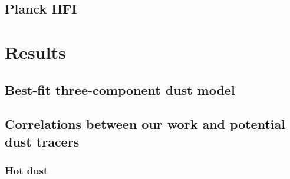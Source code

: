 \documentclass{aa}
\begin{document}
\subsection{Planck HFI}
\clearpage
\section{Results}

\subsection{Best-fit three-component dust model}

\subsection{Correlations between our work and potential dust tracers}
\subsubsection{Hot dust}
\end{document}
